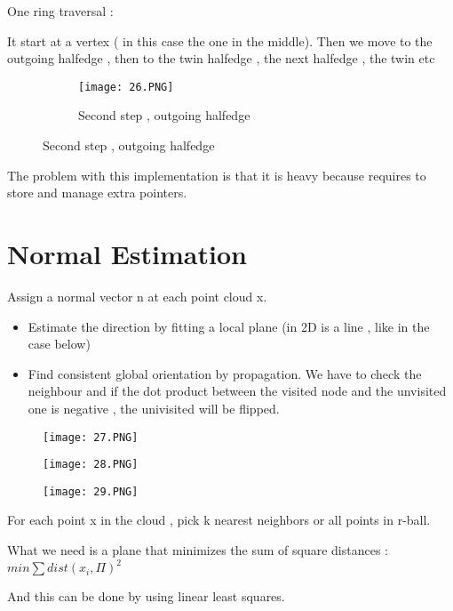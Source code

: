 \documentclass{article}
\begin{document}
One ring traversal : 

It start at a vertex ( in this case the one in the middle). Then we move to the outgoing halfedge , then to the twin halfedge , the next halfedge , the twin etc

\begin{figure}[ht!]
  \centering
  \begin{subfigure}[b]{0.3\linewidth}
    \texttt{[image: 26.PNG]}
    \caption{Second step , outgoing halfedge}
  \end{subfigure}
\end{figure}


The problem with this implementation is that it is heavy because requires to store and manage extra pointers.

\vspace{20mm}

\section{Normal Estimation}


Assign a normal vector n at each point cloud x.

\begin{itemize}
    \item Estimate the direction by fitting a local plane (in 2D is a line , like in the case below)
    \item Find consistent global orientation by propagation. We have to check the neighbour and if the dot product between the visited node and the unvisited one is negative , the univisited will be flipped.
\end{itemize}

\begin{figure}[!htb]
  \texttt{[image: 27.PNG]}
  
\endminipage\hfill
{}
  \texttt{[image: 28.PNG]}
  
\endminipage\hfill
{}%
  \texttt{[image: 29.PNG]}
  
\endminipage
\end{figure}

For each point x in the cloud , pick k nearest neighbors or all points in r-ball.

What we need is a plane that minimizes the sum of square distances : $min \sum dist (x_i , \Pi)^2$

And this can be done by using linear least squares.
\end{document}
